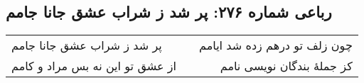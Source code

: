 \begin{center}
\section*{رباعی شماره ۲۷۶: پر شد ز شراب عشق جانا جامم}
\label{sec:sh276}
\begin{longtable}{l p{0.5cm} r}
پر شد ز شراب عشق جانا جامم
&&
چون زلف تو درهم زده شد ایامم
\\
از عشق تو این نه بس مراد و کامم
&&
کز جملهٔ بندگان نویسی نامم
\\
\end{longtable}
\end{center}
